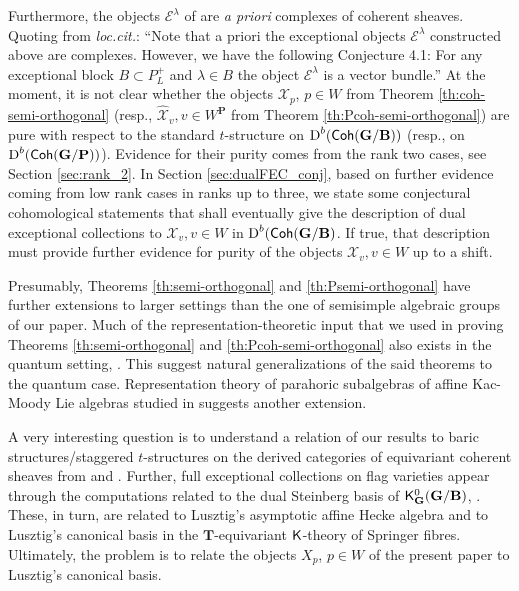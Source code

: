 \documentclass[sn-mathphys-num]{sn-jnl}%
\newcommand{\tX}{{\mathcal X}}
\newcommand*{\Dd}{\mathop{\mathrm D\kern0pt}\nolimits}
\newcommand*{\Coh}{\mathop{\sf {Coh}}\nolimits}
\newcommand{\bg}{\mathbf G}
\newcommand{\fb}{\mathbf B}
\newcommand{\bt}{\mathbf T}
\newcommand{\bp}{\mathbf P}
\theoremstyle{definition}
\begin{document}
Furthermore, the objects ${\mathcal E}^{\lambda}$ of \cite{KuzPol} are {\it a priori} complexes of coherent sheaves. 
Quoting from {\it loc.cit.}: ``Note that a priori the exceptional objects ${\mathcal E}^{\lambda}$  constructed above are complexes. 
However, we have the following Conjecture 4.1: For any exceptional block $B\subset P_L^+$ and $\lambda \in B$ the object ${\mathcal E}^{\lambda}$ is a vector bundle.'' 
At the moment, it is not clear whether the objects $\tX_p$, $p\in W$ from Theorem \ref{th:coh-semi-orthogonal} (resp., $\hat \tX_v, v\in W^{\bp}$ from Theorem \ref{th:Pcoh-semi-orthogonal}) are pure with respect to the standard $t$-structure on $\Dd^b(\Coh ( \bg/ \fb))$ (resp., on  $\Dd^b(\Coh ( \bg/ \bp))$). Evidence for their purity comes from the rank two cases, see Section \ref{sec:rank_2}. In Section \ref{sec:dualFEC_conj}, based on further evidence coming from low rank cases in ranks up to three, we state some conjectural cohomological statements that shall eventually give the description of dual exceptional collections to $\tX_v, v\in W$ in $\Dd ^b(\Coh(\bg/\fb)$. If true, that description must provide further evidence for purity of the objects $\tX_v, v\in W$ up to a shift.

Presumably, Theorems \ref{th:semi-orthogonal} and \ref{th:Psemi-orthogonal} have further extensions to larger settings than the one of 
semisimple algebraic groups of our paper. Much of the representation-theoretic input that we used in proving Theorems \ref{th:semi-orthogonal} and \ref{th:Pcoh-semi-orthogonal} also exists in the quantum setting, \cite{APW}. This suggest natural generalizations
of the said theorems to the quantum case. Representation theory of parahoric subalgebras of affine Kac-Moody Lie algebras studied in \cite{FKM} suggests another extension.

A very interesting question is to understand a relation of our results to baric structures/staggered $t$-structures on the derived categories of equivariant coherent sheaves from \cite{Achar} and \cite{AchTr}. 
Further, full exceptional collections on flag varieties appear through the computations related to the dual Steinberg basis of ${\sf K}^0_{ \bg}( \bg/ \fb)$, \cite{Daw}. 
These, in turn, are related to Lusztig's asymptotic affine Hecke algebra and to Lusztig's canonical basis in the $ \bt$-equivariant $\sf K$-theory of Springer fibres. 
Ultimately, the problem is to relate the objects $X_p$, $p\in W$ of the present paper to Lusztig's canonical basis. 
\end{document}
